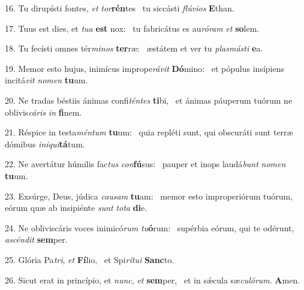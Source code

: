 16. Tu dirupísti fontes, \textit{et} \textit{tor}\textbf{rén}tes \ast\  tu siccásti \textit{flú}\textit{vi}\textit{os} \textbf{E}than.\

17. Tuus est dies, et \textit{tu}\textit{a} \textbf{est} nox: \ast\  tu fabricátus es au\textit{ró}\textit{ram} \textit{et} \textbf{so}lem.\

18. Tu fecísti omnes tér\textit{mi}\textit{nos} \textbf{ter}ræ: \ast\  æstátem et ver tu \textit{plas}\textit{más}\textit{ti} \textbf{e}a.\

19. Memor esto hujus, inimícus imprope\textit{rá}\textit{vit} \textbf{Dó}mino: \ast\  et pópulus insípiens incitá\textit{vit} \textit{no}\textit{men} \textbf{tu}um.\

20. Ne tradas béstiis ánimas confi\textit{tén}\textit{tes} \textbf{ti}bi, \ast\  et ánimas páuperum tuórum ne oblivis\textit{cá}\textit{ris} \textit{in} \textbf{fi}nem.\

21. Réspice in testa\textit{mén}\textit{tum} \textbf{tu}um: \ast\  quia repléti sunt, qui obscuráti sunt terræ dómibus \textit{in}\textit{i}\textit{qui}\textbf{tá}tum.\

22. Ne avertátur húmilis fac\textit{tus} \textit{con}\textbf{fú}sus: \ast\  pauper et inops laudá\textit{bunt} \textit{no}\textit{men} \textbf{tu}um.\

23. Exsúrge, Deus, júdica \textit{cau}\textit{sam} \textbf{tu}am: \ast\  memor esto improperiórum tuórum, eórum quæ ab insipiénte \textit{sunt} \textit{to}\textit{ta} \textbf{di}e.\

24. Ne obliviscáris voces inimicó\textit{rum} \textit{tu}\textbf{ó}rum: \ast\  supérbia eórum, qui te odérunt, \textit{a}\textit{scén}\textit{dit} \textbf{sem}per.\

25. Glória Pa\textit{tri}, \textit{et} \textbf{Fí}lio, \ast\  et Spi\textit{rí}\textit{tu}\textit{i} \textbf{Sanc}to.\

26. Sicut erat in princípio, et \textit{nunc}, \textit{et} \textbf{sem}per, \ast\  et in sǽcula sæ\textit{cu}\textit{ló}\textit{rum}. \textbf{A}men.\

